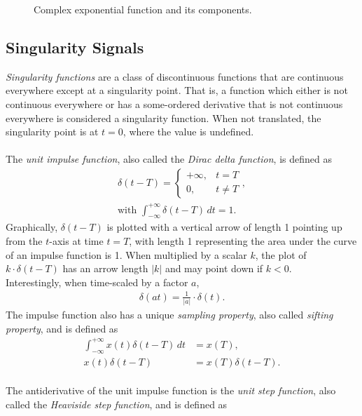\documentclass{report}
\begin{document}
\begin{figure}[hbt!]
    \caption{Complex exponential function and its components.}
    \resizebox{\textwidth}{!}{%
        
    }
\end{figure}

\subsection{Singularity Signals}
\emph{Singularity functions} are a class of discontinuous functions that are continuous everywhere except at a singularity point. That is, a function which either is not continuous everywhere 
or has a some-ordered derivative that is not continuous everywhere is considered a singularity function. 
When not translated, the singularity point is at $t=0$, where the value is undefined. 
\\ \\
The \emph{unit impulse function}, also called the \emph{Dirac delta function}, is defined as 
\begin{align}
    \delta(t-T) = 
    \begin{cases} 
        +\infty, & t=T \\
        0, & t \neq T
    \end{cases}, \\
    \text{with } \int_{-\infty}^{+\infty} \delta(t-T) \,dt = 1.
\end{align}
Graphically, $\delta(t-T)$ is plotted with a vertical arrow of length 1 pointing up from the $t$-axis at time $t=T$, with length 1 representing the area under the curve of an impulse 
function is 1. When multiplied by a scalar $k$, the plot of $k\cdot\delta(t-T)$ has an arrow length $|k|$ and may point down if $k<0$. \\
Interestingly, when time-scaled by a factor $a$, 
\begin{align}
    \delta(at) = \frac{1}{|a|}\cdot \delta(t).
\end{align}
The impulse function also has a unique \emph{sampling property}, also called \emph{sifting property}, and is defined as
\begin{align}
    \int_{-\infty}^{+\infty} x(t)\delta(t-T) \,dt &= x(T), \\
    x(t)\delta(t-T) &= x(T)\delta(t-T).
\end{align} \\
The antiderivative of the unit impulse function is the \emph{unit step function}, also called the \emph{Heaviside step function}, and is defined as 
\end{document}
